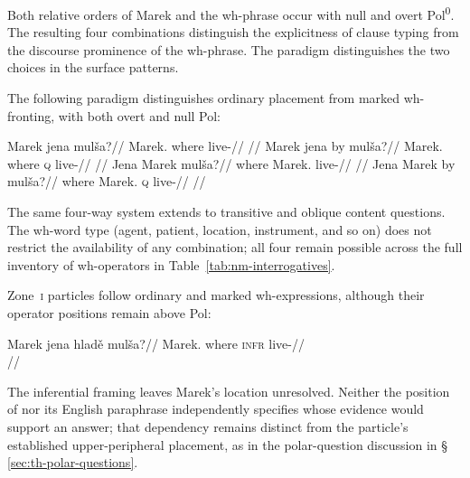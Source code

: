 Both relative orders of Marek and the wh-phrase occur with null and overt
Pol\textsuperscript{0}. The resulting four combinations distinguish the
explicitness of clause typing from the discourse prominence of the wh-phrase.
The paradigm distinguishes the two choices in the surface patterns.

The following paradigm distinguishes ordinary placement from marked
wh-fronting, with both overt and null Pol:

\pex\label{ex:wh-four-combinations}
\a
\begingl
\gla Marek jena mulša?//
\glb Marek.\Dir{} where live-\Cont{}//
\glft {} //
\endgl
\a
\begingl
\gla Marek jena by mulša?//
\glb Marek.\Dir{} where \textsc{q} live-\Cont{}//
\glft {} //
\endgl
\a
\begingl
\gla Jena Marek mulša?//
\glb where Marek.\Dir{} live-\Cont{}//
\glft {} //
\endgl
\a
\begingl
\gla Jena Marek by mulša?//
\glb where Marek.\Dir{} \textsc{q} live-\Cont{}//
\glft {} //
\endgl
\xe

The same four-way system extends to transitive and oblique content
questions. The wh-word type (agent, patient, location, instrument, and so on)
does not restrict the availability of any combination; all four remain possible
across the full inventory of wh-operators in Table~\ref{tab:nm-interrogatives}.

Zone~\textsc{i} particles follow ordinary and marked wh-expressions,
 although their operator positions remain above Pol:

\pex
\a
\begingl
\gla Marek jena hladě mulša?//
\glb Marek.\Dir{} where \textsc{infr} live-\Cont{}//
\glft {}\\
      //
\endgl
\xe

The inferential framing leaves Marek's location unresolved. Neither the
position of  nor its English paraphrase independently
specifies whose evidence would support an answer; that dependency remains
distinct from the particle's established upper-peripheral placement, as in
the polar-question discussion in §\,\ref{sec:th-polar-questions}.

